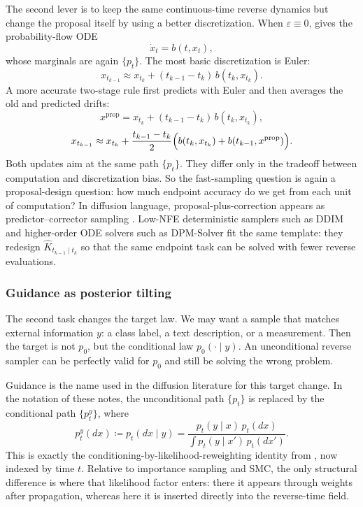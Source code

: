 The second lever is to keep the same continuous-time reverse dynamics but change the proposal itself by using a better discretization.
When \(\varepsilon\equiv 0\),  gives the probability-flow ODE
\begin{equation}
  \dot x_t=b(t,x_t),
  \label{eq:diffusion-pf-ode-local}
\end{equation}
whose marginals are again \(\{p_t\}\).
The most basic discretization is Euler:
\[
  x_{t_{k-1}}
  \approx
  x_{t_k} + (t_{k-1}-t_k)\,b(t_k,x_{t_k}).
\]
A more accurate two-stage rule first predicts with Euler and then averages the old and predicted drifts:
\[
  x^{\mathrm{prop}}
  =
  x_{t_k} + (t_{k-1}-t_k)\,b(t_k,x_{t_k}),
\]
\[
  x_{t_{k-1}}
  \approx
  x_{t_k}
  +
  \frac{t_{k-1}-t_k}{2}
  \Bigl(
    b(t_k,x_{t_k})
    +
    b(t_{k-1},x^{\mathrm{prop}})
  \Bigr).
\]
Both updates aim at the same path \(\{p_t\}\).
They differ only in the tradeoff between computation and discretization bias.
So the fast-sampling question is again a proposal-design question:
how much endpoint accuracy do we get from each unit of computation?
In diffusion language, proposal-plus-correction appears as predictor--corrector sampling \citep[Alg.~1]{song_sohl_dickstein_kingma_kumar_ermon_poole_2021_score_sde}.
Low-NFE deterministic samplers such as DDIM \citep[\S5]{song_meng_ermon_2021_ddim} and higher-order ODE solvers such as DPM-Solver \citep[\S3 and \S5.1]{lu_zhou_bao_chen_li_zhu_2022_dpm_solver} fit the same template:
they redesign \(\hat K_{t_{k-1}\mid t_k}\) so that the same endpoint task can be solved with fewer reverse evaluations.

\subsubsection{Guidance as posterior tilting}
\label{subsubsec:diffusion-conditional-sampling}

The second task changes the target law.
We may want a sample that matches external information \(y\): a class label, a text description, or a measurement.
Then the target is not \(p_0\), but the conditional law \(p_0(\cdot\mid y)\).
An unconditional reverse sampler can be perfectly valid for \(p_0\) and still be solving the wrong problem.

Guidance is the name used in the diffusion literature for this target change.
In the notation of these notes, the unconditional path \(\{p_t\}\) is replaced by the conditional path \(\{p_t^y\}\), where
\[
  p_t^y(dx)
  \coloneqq
  p_t(dx\mid y)
  =
  \frac{p_t(y\mid x)\,p_t(dx)}{\int p_t(y\mid x')\,p_t(dx')}.
\]
This is exactly the conditioning-by-likelihood-reweighting identity from , now indexed by time \(t\).
Relative to importance sampling and SMC, the only structural difference is where that likelihood factor enters:
there it appears through weights after propagation, whereas here it is inserted directly into the reverse-time field.

